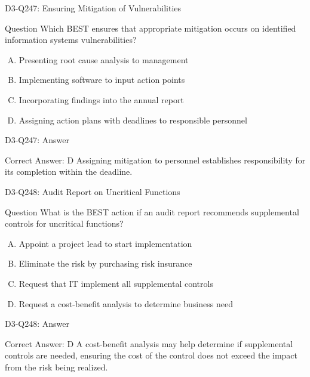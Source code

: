 \documentclass{beamer}
\begin{document}
	\begin{frame}{D3-Q247: Ensuring Mitigation of Vulnerabilities}
		\begin{block}{Question}
			Which BEST ensures that appropriate mitigation occurs on identified information systems vulnerabilities?
		\end{block}
		\begin{enumerate}[(A)]
			\item Presenting root cause analysis to management
			\item Implementing software to input action points
			\item Incorporating findings into the annual report
			\item Assigning action plans with deadlines to responsible personnel
		\end{enumerate}
	\end{frame}
	\begin{frame}{D3-Q247: Answer}
		\begin{block}{Correct Answer: D}
			Assigning mitigation to personnel establishes responsibility for its completion within the deadline.
		\end{block}
	\end{frame}
	
	\begin{frame}{D3-Q248: Audit Report on Uncritical Functions}
		\begin{block}{Question}
			What is the BEST action if an audit report recommends supplemental controls for uncritical functions?
		\end{block}
		\begin{enumerate}[(A)]
			\item Appoint a project lead to start implementation
			\item Eliminate the risk by purchasing risk insurance
			\item Request that IT implement all supplemental controls
			\item Request a cost-benefit analysis to determine business need
		\end{enumerate}
	\end{frame}
	\begin{frame}{D3-Q248: Answer}
		\begin{block}{Correct Answer: D}
			A cost-benefit analysis may help determine if supplemental controls are needed, ensuring the cost of the control does not exceed the impact from the risk being realized.
		\end{block}
	\end{frame}
	
\end{document}

